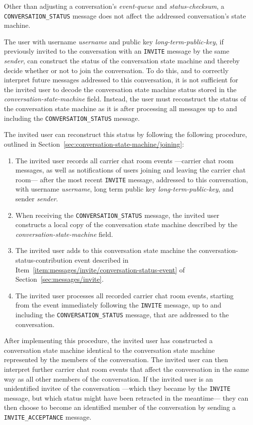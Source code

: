 \documentclass{article}
\def\message#1{\texttt{#1}}
\def\field#1{\textit{#1}}
\def\smfield#1{\textsl{#1}}
\def\type#1{\textsf{#1}}
\begin{document}
Other than adjusting a conversation's \smfield{event-queue} and \smfield{status-checksum}, a \message{CONVERSATION\_STATUS} message does not affect the addressed conversation's state machine.

The user with username \field{username} and public key \field{long-term-public-key}, if previously invited to the conversation with an \message{INVITE} message by the same \field{sender}, can construct the status of the conversation state machine and thereby decide whether or not to join the conversation.
To do this, and to correctly interpret future messages addressed to this conversation, it is not sufficient for the invited user to decode the conversation state machine status stored in the \field{conversation-state-machine} field.
Instead, the user must reconstruct the status of the conversation state machine as it is after processing all messages up to and including the \message{CONVERSATION\_STATUS} message.

The invited user can reconstruct this status by following the following procedure, outlined in Section~\ref{sec:conversation-state-machine/joining}:
\begin{enumerate}
\item The invited user records all carrier chat room events ---carrier chat room messages, as well as notifications of users joining and leaving the carrier chat room--- after the most recent \message{INVITE} message, addressed to this conversation, with username \field{username}, long term public key \field{long-term-public-key}, and sender \field{sender}.
\item When receiving the \message{CONVERSATION\_STATUS} message, the invited user constructs a local copy of the conversation state machine described by the \field{conversation-state-machine} field.
\item The invited user adds to this conversation state machine the \type{conversation-status-contribution} event described in Item~\ref{item:messages/invite/conversation-status-event} of Section~\ref{sec:messages/invite}.
\item The invited user processes all recorded carrier chat room events, starting from the event immediately following the \message{INVITE} message, up to and including the \message{CONVERSATION\_STATUS} message, that are addressed to the conversation.
\end{enumerate}
After implementing this procedure, the invited user has constructed a conversation state machine identical to the conversation state machine represented by the members of the conversation.
The invited user can then interpret further carrier chat room events that affect the conversation in the same way as all other members of the conversation.
If the invited user is an unidentified invitee of the conversation ---which they became by the \message{INVITE} message, but which status might have been retracted in the meantime--- they can then choose to become an identified member of the conversation by sending a \message{INVITE\_ACCEPTANCE} message.
\end{document}
